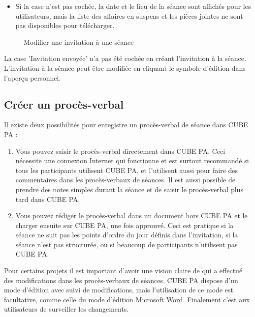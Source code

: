 \begin{itemize}
\item
Si la case n'est pas cochée, la date et le lieu de la séance sont affichés pour les utilisateurs, mais la liste des affaires en suspens et les pièces jointes ne sont pas disponibles pour télécharger.
\end{itemize}

\begin{figure}[H]
\caption{Modifier une invitation à une séance}
\end{figure}

\begin{small}
La case 'Invitation envoyée' n'a pas été cochée en créant l'invitation à la séance. L'invitation à la séance peut être modifiée en cliquant le symbole d'édition dans l'aperçu personnel.
\end{small}


\subsection{Créer un procès-verbal}

Il existe deux possibilités pour enregistre un procès-verbal de séance dans CUBE PA :

\begin{enumerate}
\item
Vous pouvez saisir le procès-verbal directement dans CUBE PA. Ceci nécessite une connexion Internet qui fonctionne et est surtout recommandé si tous les participants utilisent CUBE PA, et l'utilisent aussi pour faire des commentaires dans les procès-verbaux de séances. Il est aussi possible de prendre des notes simples durant la séance et de saisir le procès-verbal plus tard dans CUBE PA.
\item
Vous pouvez rédiger le procès-verbal dans un document hors CUBE PA et le charger ensuite sur CUBE PA, une fois approuvé. Ceci est pratique si la séance ne suit pas les points d'ordre du jour définis dans l'invitation, si la séance n'est pas structurée, ou si beaucoup de participants n'utilisent pas CUBE PA.
\end{enumerate}

Pour certains projets il est important d'avoir une vision claire de qui a effectué des modifications dans les procès-verbaux de séances. CUBE PA dispose d'un mode d'édition avec suivi de modifications, mais l'utilisation de ce mode est facultative, comme celle du mode d'édition Microsoft Word. Finalement c'est aux utilisateurs de surveiller les changements.

